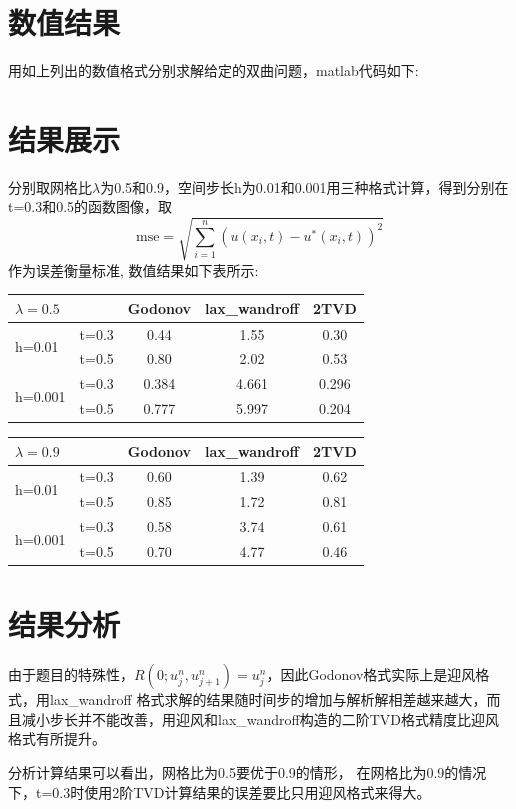 \documentclass[12pt]{article}
\theoremstyle{remark}
\begin{document}
\section{数值结果}
用如上列出的数值格式分别求解给定的双曲问题，matlab代码如下:

\section{结果展示}
分别取网格比$\lambda$为0.5和0.9，空间步长h为0.01和0.001用三种格式计算，得到分别在t=0.3和0.5的函数图像，取\[
\text{mse}=\sqrt{\sum_{i=1}^n (u(x_i,t)-u^*(x_i,t))^2}\]
作为误差衡量标准,
数值结果如下表所示:
\begin{table}[!ht]
\centering
\begin{tabular}{|l|l|ccc|}
\hline
$\lambda=0.5$&&Godonov&lax\_wandroff&2TVD\\
\hline
\multirow{2}{*}{h=0.01}&t=0.3&0.44&1.55&0.30\\
&t=0.5&0.80&2.02&0.53\\
\hline
\multirow{2}{*}{h=0.001}&t=0.3&0.384&4.661&0.296\\
&t=0.5&0.777&5.997&0.204\\
\hline
\end{tabular}
\begin{tabular}{|l|l|ccc|}
\hline
$\lambda=0.9$&&Godonov&lax\_wandroff&2TVD\\
\hline
\multirow{2}{*}{h=0.01}&t=0.3&0.60&1.39&0.62\\
&t=0.5&0.85&1.72&0.81\\
\hline
\multirow{2}{*}{h=0.001}&t=0.3&0.58&3.74&0.61\\
&t=0.5&0.70&4.77&0.46\\
\hline
\end{tabular}
\end{table}
\section{结果分析}
由于题目的特殊性，$R(0;u^n_j,u^n_{j+1})=u^n_j$，因此Godonov格式实际上是迎风格式，用lax\_wandroff
格式求解的结果随时间步的增加与解析解相差越来越大，而且减小步长并不能改善，用迎风和lax\_wandroff构造的二阶TVD格式精度比迎风格式有所提升。

分析计算结果可以看出，网格比为0.5要优于0.9的情形，
在网格比为0.9的情况下，t=0.3时使用2阶TVD计算结果的误差要比只用迎风格式来得大。
\end{document}
